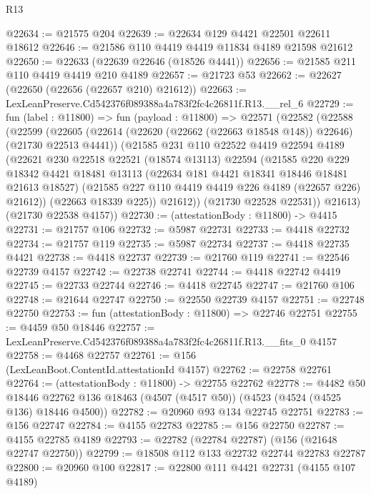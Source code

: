 \begin{lexlean}{R13}
\begin{coremodule}
@22634 := @21575 @204
@22639 := @22634 @129 @4421 @22501 @22611 @18612
@22646 := @21586 @110 @4419 @4419 @11834 @4189 @21598 @21612
@22650 := @22633 (@22639 @22646 (@18526 @4441))
@22656 := @21585 @211 @110 @4419 @4419 @210 @4189
@22657 := @21723 @53
@22662 := @22627 (@22650 (@22656 (@22657 @210) @21612))
@22663 := LexLeanPreserve.Cd542376f089388a4a783f2fc4c26811f.R13.__rel_6
@22729 := fun (label : @11800) =>
  fun (payload : @11800) =>
  @22571
    (@22582
      (@22588
        (@22599
          (@22605
            (@22614 (@22620 (@22662 (@22663 @18548 @148)) @22646) (@21730 @22513 @4441))
            (@21585
              @231
              @110
              @22522
              @4419
              @22594
              @4189
              (@22621
                @230
                @22518
                @22521
                (@18574 @13113)
                @22594
                (@21585
                  @220
                  @229
                  @18342
                  @4421
                  @18481
                  @13113
                  (@22634 @181 @4421 @18341 @18446 @18481 @21613 @18527)
                  (@21585 @227 @110 @4419 @4419 @226 @4189 (@22657 @226) @21612))
                (@22663 @18339 @225))
              @21612))
          (@21730 @22528 @22531))
        @21613)
      (@21730 @22538 @4157))
@22730 := (attestationBody : @11800) -> @4415
@22731 := @21757 @106
@22732 := @5987 @22731
@22733 := @4418 @22732
@22734 := @21757 @119
@22735 := @5987 @22734
@22737 := @4418 @22735 @4421
@22738 := @4418 @22737
@22739 := @21760 @119
@22741 := @22546 @22739 @4157
@22742 := @22738 @22741
@22744 := @4418 @22742 @4419
@22745 := @22733 @22744
@22746 := @4418 @22745
@22747 := @21760 @106
@22748 := @21644 @22747
@22750 := @22550 @22739 @4157
@22751 := @22748 @22750
@22753 := fun (attestationBody : @11800) => @22746 @22751
@22755 := @4459 @50 @18446
@22757 := LexLeanPreserve.Cd542376f089388a4a783f2fc4c26811f.R13.__fits_0 @4157
@22758 := @4468 @22757
@22761 := @156 (LexLeanBoot.ContentId.attestationId @4157)
@22762 := @22758 @22761
@22764 := (attestationBody : @11800) -> @22755 @22762
@22778 := @4482
    @50
    @18446
    @22762
    @136
    @18463
    (@4507 (@4517 @50))
    (@4523 (@4524 (@4525 @136) @18446 @4500))
@22782 := @20960 @93 @134 @22745 @22751
@22783 := @156 @22747
@22784 := @4155 @22783
@22785 := @156 @22750
@22787 := @4155 @22785 @4189
@22793 := @22782 (@22784 @22787) (@156 (@21648 @22747 @22750))
@22799 := @18508 @112 @133 @22732 @22744 @22783 @22787
@22800 := @20960 @100
@22817 := @22800
    @111
    @4421
    @22731
    (@4155 @107 @4189)

\end{coremodule}
\end{lexlean}
